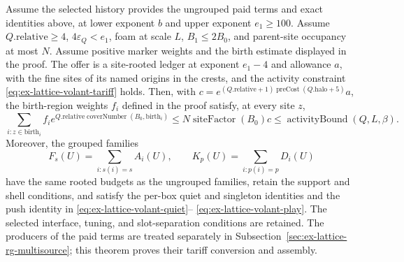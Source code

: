 \begin{theorem}
\label{thm:ex-lattice-volant-supplier}
Assume the selected history provides the ungrouped paid terms and exact
identities above, at lower exponent $b$ and upper exponent $e_1\geq100$.
Assume $Q.\mathrm{relative}\geq4$, $4\varepsilon_Q<e_1$, foam at scale $L$, $B_1\leq2B_0$, and parent-site occupancy at most $N$. Assume positive marker weights and the birth estimate displayed in the proof. The offer is a site-rooted ledger at exponent $e_1-4$ and allowance $a$, with the fine sites of its named origins in the crests, and the activity constraint \eqref{eq:ex-lattice-volant-tariff} holds. Then, with $c=e^{(Q.\mathrm{relative}+1)\operatorname{preCost}(Q.\mathrm{halo}+5)}a$, the birth-region weights $f_i$ defined in the proof satisfy, at every site $z$,
\[
 \sum_{i:z\in\mathrm{birth}_i}f_i e^{Q.\mathrm{relative}\operatorname{coverNumber}(B_0,\mathrm{birth}_i)}\leq N\operatorname{siteFactor}(B_0)c\leq\operatorname{activityBound}(Q,L,\beta).
\]
Moreover,
the grouped families
\[
 F_s(U)=\sum_{i:s(i)=s}A_i(U),\qquad
 K_p(U)=\sum_{i:p(i)=p}D_i(U)
\]
have the same rooted budgets as the ungrouped families, retain the support
and shell conditions, and satisfy the per-box quiet and singleton identities
and the push identity in \eqref{eq:ex-lattice-volant-quiet}--
\eqref{eq:ex-lattice-volant-play}. The selected interface, tuning, and
slot-separation conditions are retained. The producers of the paid
terms are treated separately in Subsection~\ref{sec:ex-lattice-rg-multisource};
this theorem proves their tariff conversion and assembly.
\end{theorem}

